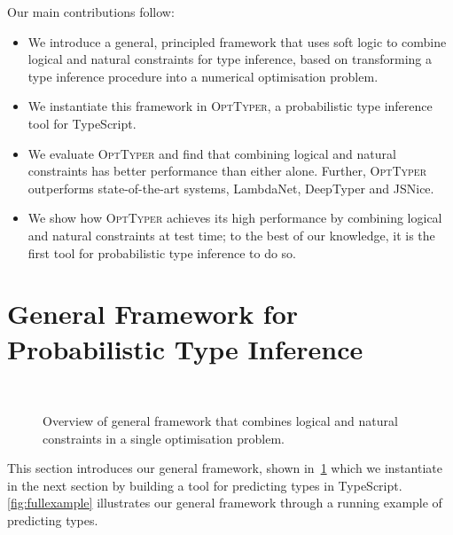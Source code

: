 \documentclass[acmsmall, review, anonymous]{acmart}\settopmatter{printfolios=true,printccs=false,printacmref=false}
\newcommand{\projectname}{\textsc{OptTyper}\xspace}
\begin{document}
Our main contributions follow:
\begin{itemize}[label=\raisebox{0.25ex}{\tiny$\bullet$}]
	\item We introduce a general, principled framework that uses soft logic to combine logical and natural constraints for type inference,
	      based on transforming a type inference procedure into a numerical optimisation problem.
	\item We instantiate this framework in \projectname, a probabilistic type inference tool for TypeScript.
	\item We evaluate \projectname and find that combining logical and natural constraints has better performance than either alone. Further, \projectname outperforms state-of-the-art systems,
	      LambdaNet, DeepTyper and JSNice.
	\item We show how \projectname achieves its high performance by combining logical and natural constraints at test time; to the best of our knowledge, it is the first tool for probabilistic type inference to do so.
\end{itemize}


\section{General Framework for Probabilistic Type Inference}~\label{sec:framework}

\begin{figure}[!t]
    \centering
    \def\svgwidth{\linewidth}
    
    \caption{Overview of general framework that combines logical
    and natural constraints in a single optimisation problem.} \label{fig:overview}
\end{figure}
This section introduces our general framework, shown in~\cref{fig:overview}
which we instantiate in the next section by building a tool for
predicting types in TypeScript.
\cref{fig:fullexample} illustrates our general framework through a running example of predicting types. 
\end{document}
